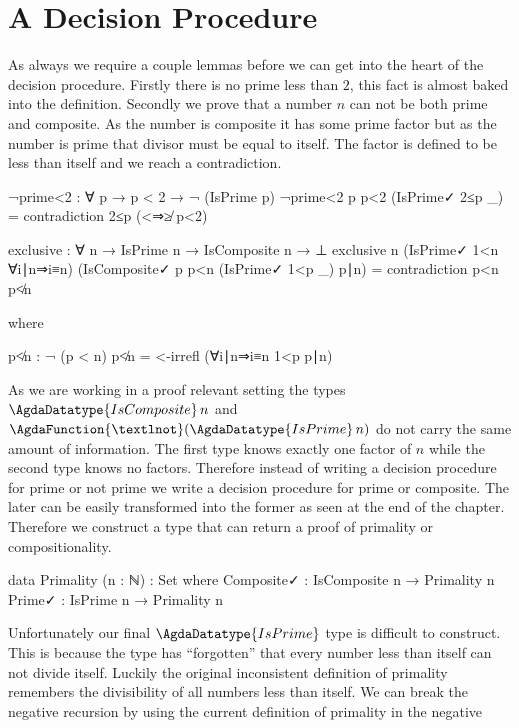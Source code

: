 \documentclass[./Thesis.tex]{subfiles}
\begin{document}
\section{A Decision Procedure}
\label{sec:a-decision-procedure}
As always we require a couple lemmas before we can get into the heart of the
decision procedure. Firstly there is no prime less than $2$, this fact is almost
baked into the definition. Secondly we prove that a number $n$ can not be both prime and
composite. As the number is composite it has some prime factor but as the
number is prime that divisor must be equal to itself. The factor is defined to
be less than itself and we reach a contradiction.
\begin{code}
  ¬prime<2 : ∀ p → p < 2 → ¬ (IsPrime p)
  ¬prime<2 p p<2 (IsPrime✓ 2≤p _) = contradiction 2≤p (<⇒≱ p<2)
\end{code}
\begin{code}
  exclusive : ∀ {n} → IsPrime n → IsComposite n → ⊥
  exclusive {n}
    (IsPrime✓ 1<n ∀i∣n⇒i≡n)
    (IsComposite✓ p p<n (IsPrime✓ 1<p _) p∣n)
    = contradiction p<n p≮n
\end{code}
\begin{code}[hide]
    where
\end{code}
\begin{code}
    p≮n : ¬ (p < n)
    p≮n = <-irrefl (∀i∣n⇒i≡n 1<p p∣n)
\end{code}
As we are working in a proof relevant setting the types
$\AgdaDatatype{IsComposite} \, n$ and
$\AgdaFunction{¬} (\AgdaDatatype{IsPrime}\, n)$ do not carry the same amount of
information. The first type knows exactly one factor of $n$ while the
second type knows no factors. Therefore instead of writing a decision procedure
for prime or not prime we write a decision procedure for prime or composite. The
later can be easily transformed into the former as seen at the end of the
chapter. Therefore we construct a type that can return a proof of primality or
compositionality.
\begin{code}
  data Primality (n : ℕ) : Set where
    Composite✓ : IsComposite n → Primality n
    Prime✓ : IsPrime n → Primality n
\end{code}
Unfortunately our final $\AgdaDatatype{IsPrime}$ type is difficult to construct.
This is because the type has ``forgotten'' that every number less than itself
can not divide itself. Luckily the original inconsistent definition of primality
remembers the divisibility of all numbers less than itself. We can break the
negative recursion by using the current definition of primality in the negative
\end{document}
